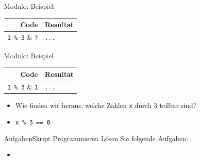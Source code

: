 \begin{frame}[fragile]{Modulo: Beispiel}
    \begin{table}
        \begin{tabular}{r|l}
            \textbf{Code}     & \textbf{Resultat} \\\midrule\midrule
            \lstinline|1 % 3| & \lstinline|?|     \\\midrule
            \lstinline|2 % 3| & \lstinline|?|     \\\midrule
            \lstinline|3 % 3| & \lstinline|?|     \\\midrule
            \lstinline|4 % 3| & \lstinline|?|     \\\midrule
            \lstinline|5 % 3| & \lstinline|?|     \\\midrule
            \lstinline|6 % 3| & \lstinline|?|     \\\midrule
            \lstinline|...|   & \lstinline|...|
        \end{tabular}
    \end{table}
\end{frame}
\begin{frame}[fragile]{Modulo: Beispiel}
    \begin{table}
        \begin{tabular}{r|l}
            \textbf{Code}     & \textbf{Resultat} \\\midrule\midrule
            \lstinline|1 % 3| & \lstinline|1|     \\\midrule
            \lstinline|2 % 3| & \lstinline|2|     \\\midrule
            \lstinline|3 % 3| & \lstinline|0|     \\\midrule
            \lstinline|4 % 3| & \lstinline|1|     \\\midrule
            \lstinline|5 % 3| & \lstinline|2|     \\\midrule
            \lstinline|6 % 3| & \lstinline|0|     \\\midrule
            \lstinline|...|   & \lstinline|...|
        \end{tabular}
    \end{table}

    \begin{itemize}[<+->]
        \item Wie finden wir heraus, welche Zahlen \lstinline|x| durch 3 teilbar sind?
        \item \lstinline|x % 3 == 0|
    \end{itemize}
\end{frame}

\begin{frame}{Aufgaben}{Skript Programmieren}
    Lösen Sie folgende Aufgaben:
    \begin{itemize}
        \item {}
    \end{itemize}
\end{frame}